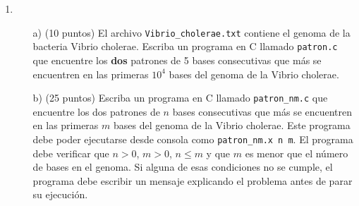 \documentclass{article}
\begin{document}
\begin{enumerate}
\begin{itemize}
\end{itemize}

\item
\begin{itemize}
\item[a)] (10 puntos) El archivo \verb"Vibrio_cholerae.txt" contiene
  el genoma de la bacteria Vibrio cholerae. Escriba un programa en C
  llamado \verb"patron.c" que encuentre los {\bf dos} patrones de 5 bases
  consecutivas que m\'as se encuentren en las primeras $10^4$ bases
  del genoma de la Vibrio cholerae. 

\item[b)] (25 puntos) Escriba un programa en C llamado
  \verb"patron_nm.c" que encuentre los dos patrones de $n$ bases
  consecutivas que m\'as se encuentren en las primeras $m$ bases del
  genoma de la Vibrio cholerae. Este programa debe poder ejecutarse
  desde consola como \verb"patron_nm.x n m". El programa debe
  verificar que $n>0$, $m>0$, $n\leq m$ y que $m$ es menor que el
  n\'umero de bases en el genoma. Si alguna de esas condiciones no se
  cumple, el programa debe escribir un mensaje explicando el problema
  antes de parar su ejecuci\'on. 
\end{itemize}



\end{enumerate}
\end{document}

